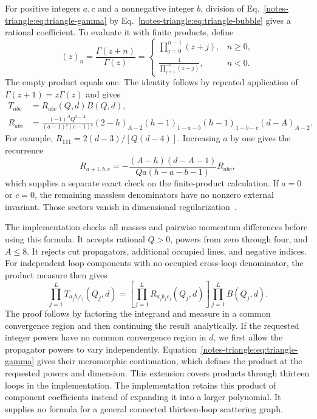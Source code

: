 For positive integers $a,c$ and a nonnegative integer $b$, division of Eq.~\eqref{notes-triangle:eq:triangle-gamma} by Eq.~\eqref{notes-triangle:eq:triangle-bubble} gives a rational coefficient. To evaluate it with finite products, define
\begin{equation}
 (z)_n=\frac{\Gamma(z+n)}{\Gamma(z)}=
 \begin{cases}
 \prod_{j=0}^{n-1}(z+j),&n\geq0,\\
 \displaystyle\frac{1}{\prod_{j=1}^{-n}(z-j)},&n<0.
 \end{cases}
 \label{notes-triangle:eq:triangle-pochhammer}
\end{equation}
The empty product equals one. The identity follows by repeated application of $\Gamma(z+1)=z\Gamma(z)$ and gives
\begin{align}
 T_{abc}&=R_{abc}(Q,d)B(Q,d),\\
 R_{abc}&=\frac{(-1)^A Q^{2-A}}{(a-1)!(c-1)!}
 (2-h)_{A-2}(h-1)_{1-a-b}(h-1)_{1-b-c}(d-A)_{A-2}.
 \label{notes-triangle:eq:triangle-rational}
\end{align}
For example, $R_{111}=2(d-3)/[Q(d-4)]$. Increasing $a$ by one gives the recurrence
\begin{equation}
 R_{a+1,b,c}=-\frac{(A-h)(d-A-1)}{Qa(h-a-b-1)}R_{abc},
 \label{notes-triangle:eq:triangle-recurrence}
\end{equation}
which supplies a separate exact check on the finite-product calculation. If $a=0$ or $c=0$, the remaining massless denominators have no nonzero external invariant. Those sectors vanish in dimensional regularization~\cite{Weinzierl2022}.

The implementation checks all masses and pairwise momentum differences before using this formula. It accepts rational $Q>0$, powers from zero through four, and $A\leq8$. It rejects cut propagators, additional occupied lines, and negative indices. For independent loop components with no occupied cross-loop denominator, the product measure then gives
\begin{equation}
 \prod_{j=1}^{L}T_{a_jb_jc_j}(Q_j,d)
 =\left[\prod_{j=1}^{L}R_{a_jb_jc_j}(Q_j,d)\right]
 \prod_{j=1}^{L}B(Q_j,d).
 \label{notes-triangle:eq:triangle-product}
\end{equation}
The proof follows by factoring the integrand and measure in a common convergence region and then continuing the result analytically. If the requested integer powers have no common convergence region in $d$, we first allow the propagator powers to vary independently. Equation~\eqref{notes-triangle:eq:triangle-gamma} gives their meromorphic continuation, which defines the product at the requested powers and dimension. This extension covers products through thirteen loops in the implementation. The implementation retains this product of component coefficients instead of expanding it into a larger polynomial. It supplies no formula for a general connected thirteen-loop scattering graph.
